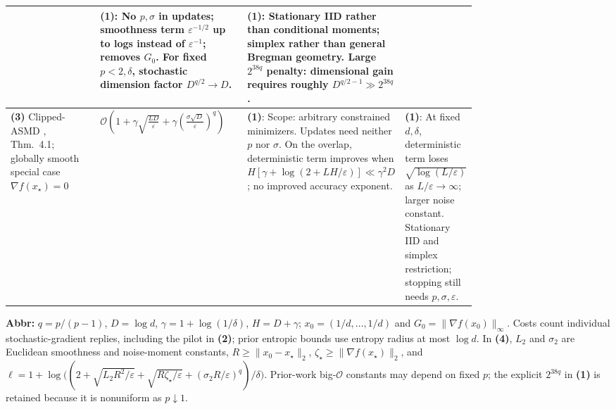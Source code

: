 \begin{table}[tp]
\begin{threeparttable}
\begin{tabularx}{\linewidth}{@{}>{\raggedright\arraybackslash}p{0.20\linewidth}>{\raggedright\arraybackslash}p{0.32\linewidth}>{\raggedright\arraybackslash}p{0.25\linewidth}>{\raggedright\arraybackslash}X@{}}
& \textbf{(1)}: No $p,\sigma$ in updates; smoothness term $\varepsilon^{-1/2}$ up to logs instead of $\varepsilon^{-1}$; removes $G_0$. For fixed $p<2,\delta$, stochastic dimension factor $D^{q/2}\to D$.
& \textbf{(1)}: Stationary IID rather than conditional moments; simplex rather than general Bregman geometry. Large $2^{38q}$ penalty: dimensional gain requires roughly $D^{q/2-1}\gg2^{38q}$. \\
\midrule
\textbf{(3)} Clipped-ASMD \citep{nguyen2023heavyv2}, Thm.~4.1; globally smooth special case $\nabla f(x_\star)=0$
& $\displaystyle\mathcal{O}\!\left(1+\gamma\sqrt{\frac{LD}{\varepsilon}}+\gamma\left(\frac{\sigma\sqrt D}{\varepsilon}\right)^q\right)$
& \textbf{(1)}: Scope: arbitrary constrained minimizers. Updates need neither $p$ nor $\sigma$. On the overlap, deterministic term improves when $H[\gamma+\log(2+LH/\varepsilon)]\ll\gamma^2D$; no improved accuracy exponent.
& \textbf{(1)}: At fixed $d,\delta$, deterministic term loses $\sqrt{\log(L/\varepsilon)}$ as $L/\varepsilon\to\infty$; larger noise constant. Stationary IID and simplex restriction; stopping still needs $p,\sigma,\varepsilon$. \\

\bottomrule
\end{tabularx}
\begin{tablenotes}[flushleft]\footnotesize
\item[] \textbf{Abbr:} $q=p/(p-1)$, $D=\log d$, $\gamma=1+\log(1/\delta)$, $H=D+\gamma$; $x_0=(1/d,\ldots,1/d)$ and $G_0=\|\nabla f(x_0)\|_\infty$. Costs count individual stochastic-gradient replies, including the pilot in \textbf{(2)}; prior entropic bounds use entropy radius at most $\log d$. In \textbf{(4)}, $L_2$ and $\sigma_2$ are Euclidean smoothness and noise-moment constants, $R\ge\|x_0-x_\star\|_2$, $\zeta_\star\ge\|\nabla f(x_\star)\|_2$, and $\ell=1+\log\!\bigl((2+\sqrt{L_2R^2/\varepsilon}+\sqrt{R\zeta_\star/\varepsilon}+(\sigma_2R/\varepsilon)^q)/\delta\bigr)$. Prior-work big-$\mathcal{O}$ constants may depend on fixed $p$; the explicit $2^{38q}$ in \textbf{(1)} is retained because it is nonuniform as $p\downarrow1$.
\end{tablenotes}
\end{threeparttable}
\end{table}
\clearpage

